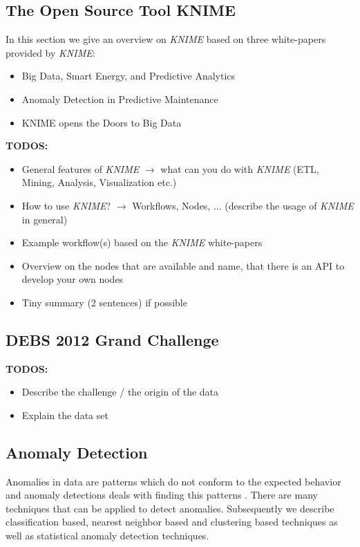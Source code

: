 \documentclass{dima}
\begin{document}
\subsection{The Open Source Tool KNIME}
\label{sec:TOSTK}

In this section we give an overview on \textit{KNIME} based on three white-papers provided by \textit{KNIME}:
\begin{itemize}
\item Big Data, Smart Energy, and Predictive Analytics
\item Anomaly Detection in Predictive Maintenance
\item KNIME opens the Doors to Big Data
\end{itemize}

\textbf{TODOS:}
\begin{itemize}
\item General features of \textit{KNIME} $\rightarrow$ what can you do with \textit{KNIME} (ETL, Mining, Analysis, Visualization etc.)
\item How to use \textit{KNIME}? $\rightarrow$ Workflows, Nodes, ... (describe the usage of \textit{KNIME} in general)
\item Example workflow(s) based on the \textit{KNIME} white-papers
\item Overview on the nodes that are available and name, that there is an API to develop your own nodes
\item Tiny summary (2 sentences) if possible
\end{itemize}

\subsection{DEBS 2012 Grand Challenge}
\label{sec:D2012GC}

\textbf{TODOS:}
\begin{itemize}
\item Describe the challenge / the origin of the data
\item Explain the data set
\end{itemize}

\subsection{Anomaly Detection}
\label{sec:AD}

Anomalies in data are patterns which do not conform to the expected behavior and anomaly detections deals with finding this patterns \cite{Chandola:2009:ADS:1541880.1541882}. There are many techniques that can be applied to detect anomalies. Subsequently we describe classification based, nearest neighbor based and clustering based techniques as well as statistical anomaly detection techniques.
\end{document}

